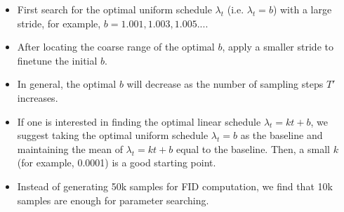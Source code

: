 \documentclass{article} \usepackage{iclr2024_conference,times}
\begin{document}
\begin{itemize}
    \item First search for the optimal uniform schedule $\lambda_t$ (i.e. $\lambda_t=b$) with a large stride, for example, $b={1.001, 1.003, 1.005...}$.  
    \item After locating the coarse range of the optimal $b$, apply a smaller stride to finetune the initial $b$.
    \item In general, the optimal $b$ will decrease as the number of sampling steps $T'$ increases.
    \item If one is interested in finding the optimal linear schedule $\lambda_t=kt+b$, we suggest taking the optimal uniform schedule $\lambda_t=b$ as the baseline and maintaining the mean of $\lambda_t=kt+b$ equal to the baseline. Then, a small $k$ (for example, 0.0001) is a good starting point. 
    \item Instead of generating 50k samples for FID computation, we find that 10k samples are enough for parameter searching. 
\end{itemize}
\end{document}
